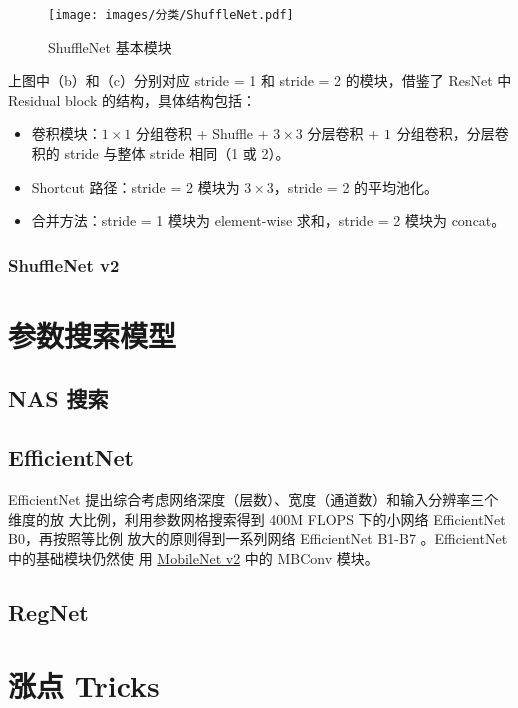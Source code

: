 \begin{figure}[ht]
  \centering
  \texttt{[image: images/分类/ShuffleNet.pdf]}
  \caption{ShuffleNet 基本模块}
  \label{fig:shufflenet}
\end{figure}

上图中（b）和（c）分别对应 stride = 1 和 stride = 2 的模块，借鉴了 ResNet 中
Residual block 的结构，具体结构包括：

\begin{itemize}
  \item 卷积模块：$1 \times 1$ 分组卷积 + Shuffle + $3 \times 3$ 分层卷积 + $1
    \time 1$ 分组卷积，分层卷积的 stride 与整体 stride 相同（1 或 2）。
  \item Shortcut 路径：stride = 2 模块为 $3 \times 3$，stride = 2 的平均池化。
  \item 合并方法：stride = 1 模块为 element-wise 求和，stride = 2 模块为 concat。
\end{itemize}

\subsection{ShuffleNet v2}

\chapter{参数搜索模型}

\section{NAS 搜索}

\section{EfficientNet}
EfficientNet 提出综合考虑网络深度（层数）、宽度（通道数）和输入分辨率三个维度的放
大比例，利用参数网格搜索得到 400M FLOPS 下的小网络 EfficientNet B0，再按照等比例
放大的原则得到一系列网络 EfficientNet B1-B7
\cite{2019-EfficientNet}。EfficientNet中的基础模块仍然使
用 \hyperref[subsec:MobileNetv2]{MobileNet v2} 中的 MBConv 模块。

\section{RegNet}

\chapter{涨点 Tricks}
